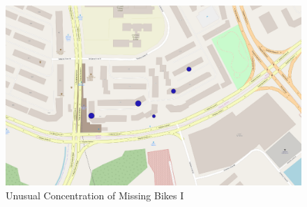 \documentclass[a4paper, fleqn]{article}
\begin{document}
\begin{itemize}
\begin{figure}[h!]
\includegraphics[width=\linewidth]{./assets/201802092151.png}
\caption{Unusual Concentration of Missing Bikes I}
\label{figure:map6}
\end{figure}

\end{itemize}
\end{document}
